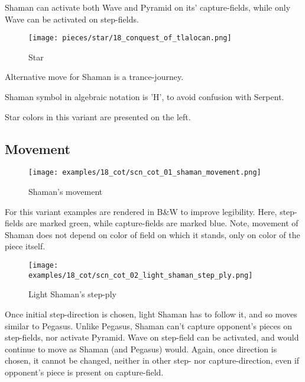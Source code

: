 Shaman can activate both Wave and Pyramid on its' capture-fields, while only
Wave can be activated on step-fields.

\noindent
\begin{wrapfigure}{l}{0.4\textwidth}
\centering
\texttt{[image: pieces/star/18\_conquest\_of\_tlalocan.png]}
\caption{Star}
\label{fig:star/18_conquest_of_tlalocan}
\end{wrapfigure}
Alternative move for Shaman is a trance-journey.

Shaman symbol in algebraic notation is 'H', to avoid confusion with Serpent.

Star colors in this variant are presented on the left.

\clearpage %

\subsection*{Movement}

\noindent
\begin{figure}[!h]
\texttt{[image: examples/18\_cot/scn\_cot\_01\_shaman\_movement.png]}
\caption{Shaman's movement}
\label{fig:scn_cot_01_shaman_movement}
\end{figure}

For this variant examples are rendered in B\&W to improve legibility.
Here, step-fields are marked green, while capture-fields are marked blue.
Note, movement of Shaman does not depend on color of field on which it
stands, only on color of the piece itself.

\clearpage %

\noindent
\begin{figure}[!h]
\texttt{[image: examples/18\_cot/scn\_cot\_02\_light\_shaman\_step\_ply.png]}
\caption{Light Shaman's step-ply}
\label{fig:scn_cot_02_light_shaman_step_ply}
\end{figure}

Once initial step-direction is chosen, light Shaman has to follow it,
and so moves similar to Pegasus. Unlike Pegasus, Shaman can't capture
opponent's pieces on step-fields, nor activate Pyramid. Wave on step-field
can be activated, and would continue to move as Shaman (and Pegasus)
would. Again, once direction is chosen, it cannot be changed, neither
in other step- nor capture-direction, even if opponent's piece is present
on capture-field.

